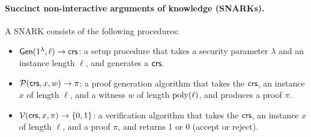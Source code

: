 \paragraph{Succinct non-interactive arguments of knowledge (SNARKs).}
A SNARK consists of the following procedures:
\begin{itemize}
    \item $\mathsf{Gen}(1^\lambda, \ell)\to \mathsf{crs}$: a setup procedure that takes a security parameter $\lambda$
		and an instance length $\ell$, and generates a $\mathsf{crs}$.
    \item $\mathcal{P}(\mathsf{crs}, x, w)\to \pi$: a proof generation algorithm that takes the $\mathsf{crs}$, an instance $x$ of length $\ell$,
		and a witness $w$ of length $\operatorname{poly}(\ell)$,
		and produces a proof $\pi$.
    \item $\mathcal{V}(\mathsf{crs}, x, \pi)\to \left \{{0,1} \right \}$: a verification algorithm that takes the $\mathsf{crs}$, an instance $x$ of length $\ell$,
		and a proof $\pi$, and returns 1 or 0 (accept or reject).
\end{itemize}
\vspace{-1ex}
\vspace{-1ex}
